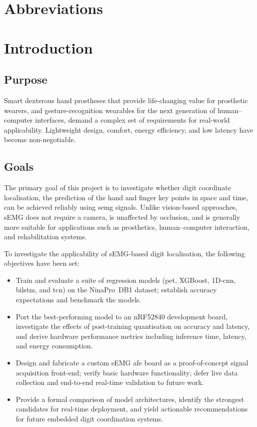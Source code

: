 \documentclass[11pt]{article}
\def\mainmatter{%
    \pagenumbering{arabic}
    \setcounter{page}{1}
    \setcounter{section}{0}
    \renewcommand{\thesection}{\arabic{section}}
}%
\begin{document}
\section*{Abbreviations}
\printglossary[type=\acronymtype,title={}]

\clearpage  

\mainmatter

\section{Introduction}

\subsection{Purpose}
Smart dexterous hand prostheses that provide life-changing value for prosthetic wearers, and gesture-recognition wearables for the next generation of human--computer interfaces, demand a complex set of requirements for real-world applicability. Lightweight design, comfort, energy efficiency, and low latency have become non-negotiable.

\subsection{Goals}
The primary goal of this project is to investigate whether digit coordinate localisation, the prediction of the hand and finger key points in space and time, can be achieved reliably using \gls{semg} signals. Unlike vision-based approaches, sEMG does not require a camera, is unaffected by occlusion, and is generally more suitable for applications such as prosthetics, human--computer interaction, and rehabilitation systems.

To investigate the applicability of sEMG-based digit localisation, the following objectives have been set:

\begin{itemize}
    \item Train and evaluate a suite of regression models (\gls{pet}, XGBoost, 1D-\gls{cnn}, \gls{bilstm}, and \gls{tcn}) on the NinaPro~DB1 dataset; establish accuracy expectations and benchmark the models.
    \item Port the best-performing model to an nRF52840 development board, investigate the effects of post-training quantisation on accuracy and latency, and derive hardware performance metrics including inference time, latency, and energy consumption.
    \item Design and fabricate a custom sEMG \gls{afe} board as a proof-of-concept signal acquisition front-end; verify basic hardware functionality; defer live data collection and end-to-end real-time validation to future work.
    \item Provide a formal comparison of model architectures, identify the strongest candidates for real-time deployment, and yield actionable recommendations for future embedded digit coordination systems.
\end{itemize}
\end{document}

